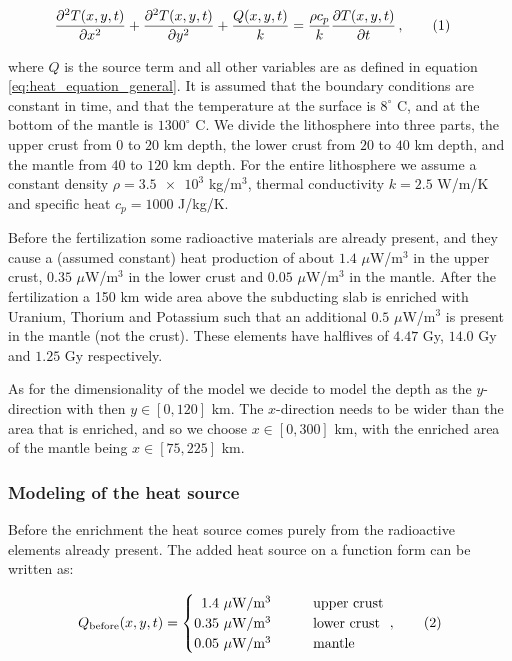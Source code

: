 \documentclass[reprint,english,notitlepage]{revtex4-1}  %
\newcommand\numberthis{\addtocounter{equation}{1}\tag{\theequation}}
\begin{document}
\begin{align*}
\frac{\partial^2 T(x,y,t)}{\partial x^2} + \frac{\partial^2 T(x,y,t)}{\partial y^2} + \frac{Q(x,y,t)}{k} &= \frac{\rho c_p}{k} \frac{\partial T(x,y,t)}{\partial t} \, , \numberthis \label{eq:heat_eq_with_source_term}
\end{align*} 

where $Q$ is the source term and all other variables are as defined in equation \eqref{eq:heat_equation_general}. It is assumed that the boundary conditions are constant in time, and that the temperature at the surface is $8^\circ$ C, and at the bottom of the mantle is $1300^\circ$ C. We divide the lithosphere into three parts, the upper crust from $0$ to $20$ km depth, the lower crust from $20$ to $40$ km depth, and the mantle from $40$ to $120$ km depth. For the entire lithosphere we assume a constant density $\rho = \num{3.5e3}$ kg/m$^3$, thermal conductivity $k = 2.5$ W/m/K and specific heat $c_p = 1000$ J/kg/K.

Before the fertilization some radioactive materials are already present, and they cause a (assumed constant) heat production of about $1.4$ $\mu$W/m$^3$ in the upper crust, $0.35$ $\mu$W/m$^3$ in the lower crust and $0.05$ $\mu$W/m$^3$ in the mantle. After the fertilization a 150 km wide area above the subducting slab is enriched with Uranium, Thorium and Potassium such that an additional $0.5$ $\mu$W/m$^3$ is present in the mantle (not the crust). These elements have halflives of $4.47$ Gy, $14.0$ Gy and $1.25$ Gy respectively.

As for the dimensionality of the model we decide to model the depth as the $y$-direction with then $y \in [0,120]$ km. The $x$-direction needs to be wider than the area that is enriched, and so we choose $x \in [0,300]$ km, with the enriched area of the mantle being $x \in [75,225]$ km. 


\subsubsection{Modeling of the heat source} \label{sec:formalism_heat_source_model}

Before the enrichment the heat source comes purely from the radioactive elements already present. The added heat source on a function form can be written as:

\begin{align*}
Q_\text{before}(x,y,t) = \begin{cases}
\,\,\, 1.4 \text{ $\mu$W/m$^3$} \quad  \quad  &\text{upper crust} \\
0.35 \text{ $\mu$W/m$^3$} \quad  \quad &\text{lower crust} \\
0.05 \text{ $\mu$W/m$^3$} \quad  \quad &\text{mantle}
\end{cases} \, , \numberthis \label{eq:unfertilized_heat}
\end{align*}
\end{document}

